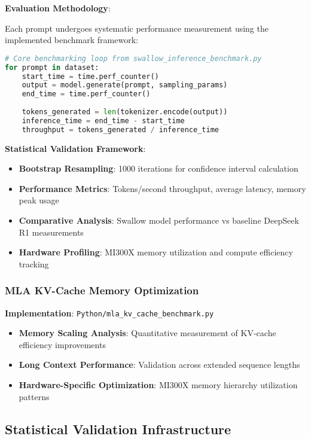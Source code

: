 \documentclass[12pt,a4paper]{article}
\begin{document}
\textbf{Evaluation Methodology}:

Each prompt undergoes systematic performance measurement using the implemented benchmark framework:

\begin{lstlisting}[language=Python, caption=Core Benchmarking Loop]
# Core benchmarking loop from swallow_inference_benchmark.py
for prompt in dataset:
    start_time = time.perf_counter()
    output = model.generate(prompt, sampling_params)
    end_time = time.perf_counter()
    
    tokens_generated = len(tokenizer.encode(output))
    inference_time = end_time - start_time
    throughput = tokens_generated / inference_time
\end{lstlisting}

\textbf{Statistical Validation Framework}:

\begin{itemize}
\item \textbf{Bootstrap Resampling}: 1000 iterations for confidence interval calculation
\item \textbf{Performance Metrics}: Tokens/second throughput, average latency, memory peak usage
\item \textbf{Comparative Analysis}: Swallow model performance vs baseline DeepSeek R1 measurements
\item \textbf{Hardware Profiling}: MI300X memory utilization and compute efficiency tracking
\end{itemize}

\subsubsection{MLA KV-Cache Memory Optimization}

\textbf{Implementation}: \texttt{Python/mla\_kv\_cache\_benchmark.py}

\begin{itemize}
\item \textbf{Memory Scaling Analysis}: Quantitative measurement of KV-cache efficiency improvements
\item \textbf{Long Context Performance}: Validation across extended sequence lengths
\item \textbf{Hardware-Specific Optimization}: MI300X memory hierarchy utilization patterns
\end{itemize}

\subsection{Statistical Validation Infrastructure}
\end{document}
